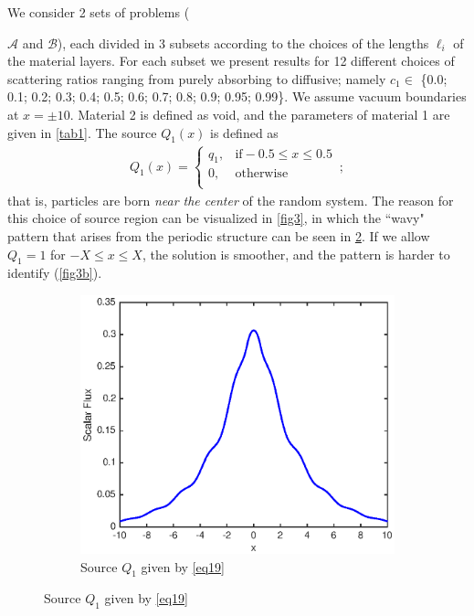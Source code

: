 \documentclass[12pt]{article}
\newcommand{\seta}{\mathcal{A}}
\newcommand{\setb}{\mathcal{B}}
\begin{document}
We consider 2 sets of problems ({$\seta$ and $\setb$), each divided in 3 subsets according to the choices of the lengths $\ell_i$ of the material layers. For each subset we present results for 12 different choices of scattering ratios ranging from purely absorbing to diffusive; namely $c_1 \in$ \{0.0; 0.1; 0.2; 0.3; 0.4; 0.5; 0.6; 0.7; 0.8; 0.9; 0.95; 0.99\}. We assume vacuum boundaries at $x = \pm 10$. Material 2 is defined as void, and the parameters of material 1 are given in \cref{tab1}. The source $Q_1(x)$ is defined as 
\begin{align}\label{eq19}
Q_1(x) = \left\{
\begin{array}{cl}
q_1, & \text{if} -0.5\leq x\leq 0.5\\
0, &\text{otherwise}\\
\end{array}
\right .\, ; 
\end{align}
that is, particles are born {\em near the center} of the random system. The reason for this choice of source region can be visualized in \cref{fig3}, in which the ``wavy" pattern that arises from the periodic structure can be seen in \cref{fig3a}. If we allow $Q_1=1$ for $-X\leq x\leq X$, the solution is smoother, and the pattern is harder to identify (\cref{fig3b}).    
\begin{figure}[hbt]
    \centering
    \begin{subfigure}{0.495\textwidth}
        \centering
        \includegraphics[width=\textwidth]{fig3a.eps}
        \caption{Source $Q_1$ given by \cref{eq19}}
        \label{fig3a}

\end{subfigure}
\end{figure}}
\end{document}
